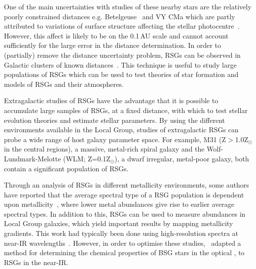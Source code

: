 One of the main uncertainties with studies of these nearby stars are the relatively poorly constrained distances e.g. Betelgeuse~\citep[197\,$\pm$\,45\,pc;][]{Harper08} and VY CMa
\citep[$\sim$1300\,$\pm$\,120\,pc;][]{Wittowski12,2012ApJ...744...23Z} which are partly attributed to variations of surface structure affecting the stellar photocentre~\citep{2011A&A...528A.120C}.
However, this affect is likely to be on the 0.1\,AU scale and cannot account sufficiently for the large error in the distance determination.
In order to (partially) remove the distance uncertainty problem, RSGs can be observed in Galactic clusters of known distances~\citep[e.g.][]{Humphreys78, Mel'Nik95,2014ApJ...788...58G}.
This technique is useful to study large populations of RSGs which can be used to test theories of star formation and models of RSGs and their atmospheres.


Extragalactic studies of RSGs have the advantage that it is possible to accumulate large samples of RSGs, at a fixed distance, with which to test stellar evolution theories and estimate stellar parameters.
By using the different environments available in the Local Group, studies of extragalactic RSGs can probe a wide range of host galaxy parameter space.
For example, M31 (Z$>$1.0Z$_{\odot}$ in the central regions), a massive, metal-rich spiral galaxy and the Wolf-Lundmark-Melotte (WLM; Z=0.1Z$_{\odot}$), a dwarf irregular, metal-poor galaxy, both contain a significant population of RSGs.

Through an analysis of RSGs in different metallicity environments, some authors have reported that the average spectral type of a RSG population is dependent upon metallicity~\citep{Elias85, MasseyOlsen03, 2012AJ....144....2L}, where lower metal abundances give rise to earlier average spectral types.
In addition to this, RSGs can be used to measure abundances in Local Group galaxies, which yield important results by mapping metallicity gradients.
This work had typically been done using high-resolution spectra at near-IR wavelengths~\citep{Cunha07, Davies09a,Davies09b}.
However, in order to optimise these studies,~\cite{2010MNRAS.407.1203D} adapted a method for determining the chemical properties of BSG stars in the optical
\citep{2008ApJ...681..269K,2010AN....331..459K}, to RSGs in the near-IR.

